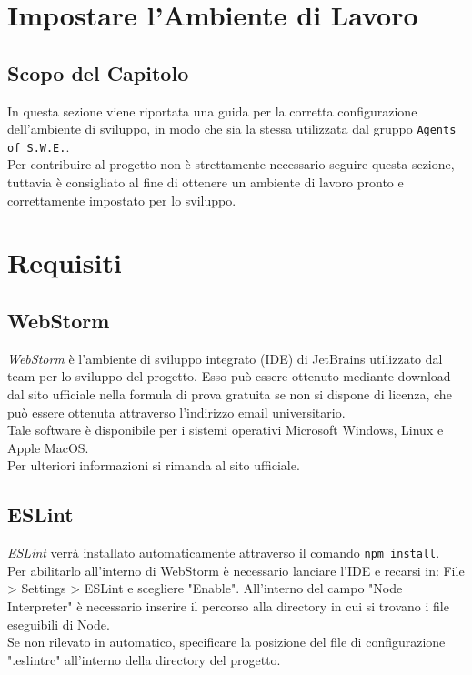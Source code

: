 \section{Impostare l'Ambiente di Lavoro}\label{AmbienteLavoro}
\subsection{Scopo del Capitolo}\label{AmbienteLavoro_scopo}
In questa sezione viene riportata una guida per la corretta configurazione dell'ambiente di sviluppo, in modo che sia la stessa utilizzata dal gruppo \texttt{Agents of S.W.E.}.\\
Per contribuire al progetto non è strettamente necessario seguire questa sezione, tuttavia è consigliato al fine di ottenere un ambiente di lavoro pronto e correttamente impostato per lo sviluppo.

\section{Requisiti}\label{AmbienteLavoro_requisiti}
\subsection{WebStorm}\label{webstorm}
\textit{WebStorm} è l'ambiente di sviluppo integrato (IDE) di JetBrains utilizzato dal team per lo sviluppo del progetto. Esso può essere ottenuto mediante download dal sito ufficiale nella formula di prova gratuita se non si dispone di licenza, che può essere ottenuta attraverso l'indirizzo email universitario.\\
Tale software è disponibile per i sistemi operativi Microsoft Windows, Linux e Apple MacOS.\\
Per ulteriori informazioni si rimanda al sito ufficiale.

\subsection{ESLint}\label{eslint}
\textit{ESLint} verrà installato automaticamente attraverso il comando \texttt{npm install}.\\
Per abilitarlo all'interno di WebStorm è necessario lanciare l'IDE e recarsi in: File > Settings > ESLint e scegliere "Enable". All'interno del campo "Node Interpreter" è necessario inserire il percorso alla directory in cui si trovano i file eseguibili di Node.\\
Se non rilevato in automatico, specificare la posizione del file di configurazione ".eslintrc" all'interno della directory del progetto.

